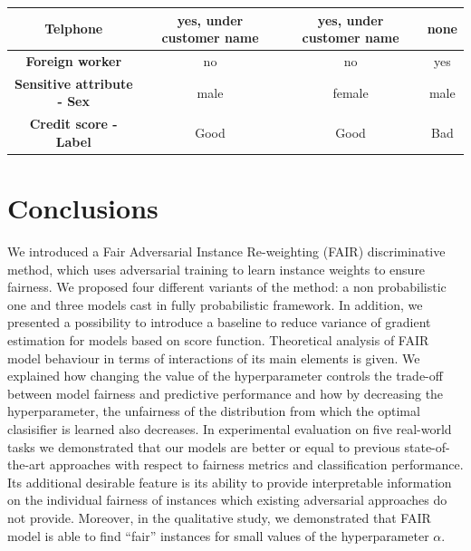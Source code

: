 \documentclass[preprint,12pt]{elsarticle}
\begin{document}
\begin{table}
{\begin{tabular}{|c|c|c|c|}
		\textbf{Telphone}                                        & yes,   under customer name & yes,   under customer name                                                           & none                                                                                 \\ \hline
		\textbf{Foreign worker}                                  & no                         & no                                                                                   & yes                                                                                  \\ \hline
		\textbf{Sensitive attribute - Sex}                                             & male                       & female                                                                               & male                                                                                 \\ \hline
		\textbf{Credit score -Label}                                           & Good                       & Good                                                                                 & Bad                                                                                  \\ \hline
	\end{tabular}}
	\label{tab:Explainability}
\end{table}

\section{Conclusions}
\label{Sec:Conclusion}
We introduced a Fair Adversarial Instance Re-weighting (FAIR) discriminative method, which uses adversarial training to learn instance weights to ensure fairness. We proposed four different variants of the method: a non probabilistic one and three models cast in fully probabilistic framework. In addition, we presented a possibility to introduce a baseline to reduce variance of gradient estimation for models based on score function. Theoretical analysis of FAIR model behaviour in terms of interactions of its main elements is given. We explained how changing the value of the hyperparameter controls the trade-off between model fairness and predictive performance and how by decreasing the hyperparameter, the unfairness of the distribution from which the optimal clasisifier is learned also decreases. In experimental evaluation on five real-world tasks we demonstrated that our models are better or equal to previous state-of-the-art approaches with respect to fairness metrics and classification performance. Its additional desirable feature is its ability to provide interpretable information on the individual fairness of instances which existing adversarial approaches do not provide. Moreover, in the qualitative study, we demonstrated that FAIR model is able to find ``fair'' instances for small values of the hyperparameter $\alpha$.
\end{document}
